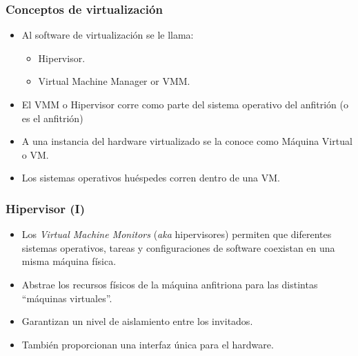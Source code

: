 \documentclass{beamer}
\begin{document}


\begin{frame}
\frametitle{Conceptos de virtualización}

\begin{itemize}
\item Al software de virtualización se le llama:
	\begin{itemize}
	\item  \alert{Hipervisor}.
	\item  \alert{Virtual Machine Manager} or \alert{VMM}.
	\end{itemize}
\item El VMM o Hipervisor corre como parte del sistema operativo del anfitrión (o es el anfitrión)
\item A una instancia del hardware virtualizado se la conoce como \alert{Máquina Virtual} o \alert{VM}.
\item Los sistemas operativos huéspedes corren dentro de una VM.
\end{itemize}

\end{frame}



\begin{frame}
\frametitle{Hipervisor (I)}

\begin{itemize}
\item Los \textit{Virtual Machine Monitors} (\textit{aka} \alert{hipervisores}) permiten que diferentes sistemas operativos, tareas y configuraciones de software coexistan en una misma máquina física.
\item Abstrae los recursos físicos de la máquina anfitriona para las distintas ``máquinas virtuales''.
\item Garantizan un nivel de aislamiento entre los invitados.
\item También proporcionan una interfaz única para el hardware.
\end{itemize}

\end{frame}

\end{document}
